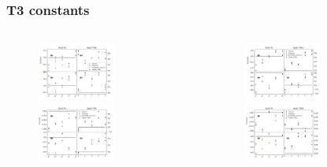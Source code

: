 \documentclass[aspectratio=1610, 12pt]{beamer}
\begin{document}
\begin{frame}\frametitle{T3 constants}
  \begin{columns}
    \begin{column}[c]{0.5\textwidth}
      \begin{figure}
        \includegraphics[width=0.6\textwidth]{plots/compi/Tx/blue_red_comp_T3U_Tx.pdf}
        \includegraphics[width=0.6\textwidth]{plots/compi/Tx/blue_red_comp_T3V_Tx.pdf}
      \end{figure}
    \end{column}
    \begin{column}[c]{0.5\textwidth}
      \begin{figure}
        \includegraphics[width=0.6\textwidth]{plots/compi/Tx/blue_red_comp_T3X1_Tx.pdf}
        \includegraphics[width=0.6\textwidth]{plots/compi/Tx/blue_red_comp_T3X2_Tx.pdf}

\end{figure}
\end{column}
\end{columns}
\end{frame}
\end{document}
